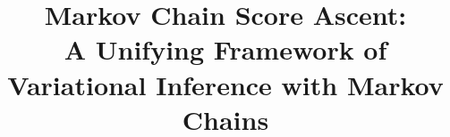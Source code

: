 \documentclass{article}
\title{Markov Chain Score Ascent: \\ A Unifying Framework of \\ Variational Inference with Markov Chains}
\author{%
}
\begin{document}
\maketitle

\begin{abstract}
  
\end{abstract}









\newpage



\newpage
\appendix


\end{document}
